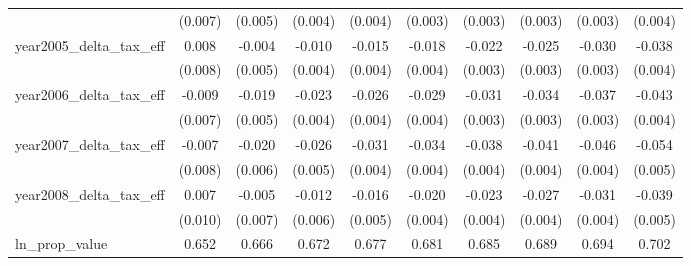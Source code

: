 {\begin{tabular}{l*{9}{c}}
            &     (0.007)         &     (0.005)         &     (0.004)         &     (0.004)         &     (0.003)         &     (0.003)         &     (0.003)         &     (0.003)         &     (0.004)         \\
[1em]
year2005_delta_tax_eff&       0.008         &      -0.004         &      -0.010\sym{**} &      -0.015\sym{***}&      -0.018\sym{***}&      -0.022\sym{***}&      -0.025\sym{***}&      -0.030\sym{***}&      -0.038\sym{***}\\
            &     (0.008)         &     (0.005)         &     (0.004)         &     (0.004)         &     (0.004)         &     (0.003)         &     (0.003)         &     (0.003)         &     (0.004)         \\
[1em]
year2006_delta_tax_eff&      -0.009         &      -0.019\sym{***}&      -0.023\sym{***}&      -0.026\sym{***}&      -0.029\sym{***}&      -0.031\sym{***}&      -0.034\sym{***}&      -0.037\sym{***}&      -0.043\sym{***}\\
            &     (0.007)         &     (0.005)         &     (0.004)         &     (0.004)         &     (0.004)         &     (0.003)         &     (0.003)         &     (0.003)         &     (0.004)         \\
[1em]
year2007_delta_tax_eff&      -0.007         &      -0.020\sym{***}&      -0.026\sym{***}&      -0.031\sym{***}&      -0.034\sym{***}&      -0.038\sym{***}&      -0.041\sym{***}&      -0.046\sym{***}&      -0.054\sym{***}\\
            &     (0.008)         &     (0.006)         &     (0.005)         &     (0.004)         &     (0.004)         &     (0.004)         &     (0.004)         &     (0.004)         &     (0.005)         \\
[1em]
year2008_delta_tax_eff&       0.007         &      -0.005         &      -0.012\sym{**} &      -0.016\sym{***}&      -0.020\sym{***}&      -0.023\sym{***}&      -0.027\sym{***}&      -0.031\sym{***}&      -0.039\sym{***}\\
            &     (0.010)         &     (0.007)         &     (0.006)         &     (0.005)         &     (0.004)         &     (0.004)         &     (0.004)         &     (0.004)         &     (0.005)         \\
[1em]
ln_prop_value&       0.652\sym{***}&       0.666\sym{***}&       0.672\sym{***}&       0.677\sym{***}&       0.681\sym{***}&       0.685\sym{***}&       0.689\sym{***}&       0.694\sym{***}&       0.702\sym{***}\\

\end{tabular}}
